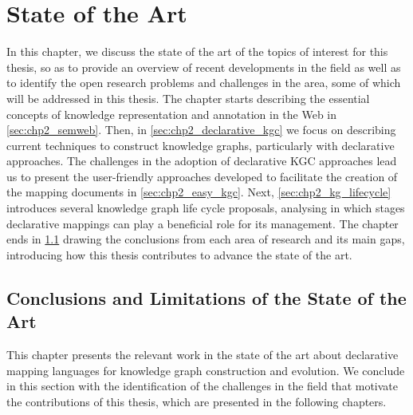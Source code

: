 \chapter{State of the Art}
\label{chapter:sota}

In this chapter, we discuss the state of the art of the topics of interest for this thesis, so as to provide an overview of recent developments in the field as well as to identify the open research problems and challenges in the area, some of which will be addressed in this thesis. The chapter starts describing the essential concepts of knowledge representation and annotation in the Web in \cref{sec:chp2_semweb}. Then, in \cref{sec:chp2_declarative_kgc} we focus on describing current techniques to construct knowledge graphs, particularly with declarative approaches. The challenges in the adoption of declarative KGC approaches lead us to present the user-friendly approaches developed to facilitate the creation of the mapping documents in \cref{sec:chp2_easy_kgc}. Next, \cref{sec:chp2_kg_lifecycle} introduces several knowledge graph life cycle proposals, analysing in which stages declarative mappings can play a beneficial role for its management. The chapter ends in \cref{sec:chp2_conclusions-sota} drawing the conclusions from each area of research and its main gaps, introducing how this thesis contributes to advance the state of the art. 










\section{Conclusions and Limitations of the State of the Art}
\label{sec:chp2_conclusions-sota}

This chapter presents the relevant work in the state of the art about declarative mapping languages for knowledge graph construction and evolution. We conclude in this section with the identification of the challenges in the field that motivate the contributions of this thesis, which are presented in the following chapters.

